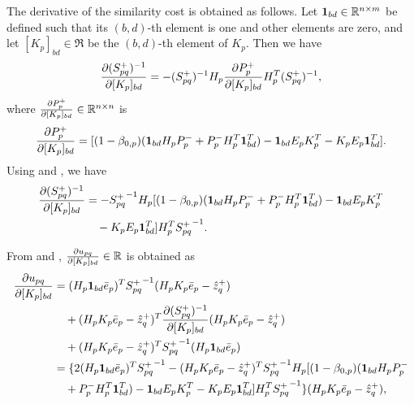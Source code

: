 \begin{appendix}
The derivative of the similarity cost is obtained as follows.
Let $\mathbf{1}_{bd}\in \mathbb{R}^{n\times m}$ be defined such that its $(b,d)$-th element is one and other elements are zero, and let $[K_p]_{bd}\in\Re$ be the $(b,d)$-th element of $K_p$.
Then we have
\begin{align}
\frac{\partial (S^+_{pq})^{-1}}{\partial [K_p]_{bd}}
=-(S^+_{pq})^{-1}
H_p
\frac{\partial P^+_{p}}{\partial [K_p]_{bd}}
H_p^T
(S^+_{pq})^{-1}
,\label{eqn:SS1}
\end{align}
where $\frac{\partial P^+_{p}}{\partial [K_p]_{bd}}\in\mathbb{R}^{n\times n}$ is
\begin{align}
\frac{\partial P^+_{p}}{\partial [K_p]_{bd}}
=
[(1-\beta_{0,p})(\mathbf{1}_{bd} H_pP_p^-+P_p^-H_p^T\mathbf{1}_{bd}^T)-\mathbf{1}_{bd} E_pK_p^T -K_pE_p\mathbf{1}_{bd}^T].\label{eqn:SSmidpart}
\end{align}
Using  and , we have
\begin{align}
\frac{\partial (S^+_{pq})^{-1}}{\partial [K_p]_{bd}}&=-{S^+_{pq}}^{-1}
H_p
[(1-\beta_{0,p})(\mathbf{1}_{bd} H_pP_p^-+P_p^-H_p^T\mathbf{1}_{bd}^T)-\mathbf{1}_{bd} E_pK_p^T
\nonumber
\\
& \quad 
-K_pE_p\mathbf{1}_{bd}^T]
H_p^T
{S^+_{pq}}^{-1}.
\label{eqn:SS2}
\end{align}




From  and , $\frac{\partial u_{pq}}{\partial [K_p]_{bd}}\in\mathbb{R}$ is obtained as
\begin{align}
\frac{\partial u_{pq}}{\partial [K_p]_{bd}}
&=
(H_p\mathbf{1}_{bd}{\bar{e}}_p)^T
{S_{pq}^+}^{-1}
(H_pK_p{\bar{e}}_p-\hat z^+_{q})
\nonumber
\\
& \quad
+(H_pK_p{\bar{e}}_p-\hat z^+_{q})^T
\frac{\partial (S^+_{pq})^{-1}}{\partial [K_p]_{bd}}
(H_pK_p{\bar{e}}_p-\hat z^+_{q})
\nonumber
\\
& \quad 
+
(H_pK_p{\bar{e}}_p-\hat z^+_{q})^T
{S_{pq}^+}^{-1}
(H_p\mathbf{1}_{bd}{\bar{e}}_p)\nonumber
\\
&=
\{
2(H_p\mathbf{1}_{bd}{\bar{e}}_p)^T
{S_{pq}^+}^{-1}
-(H_pK_p{\bar{e}}_p-\hat z^+_{q})^T
{S^+_{pq}}^{-1}
H_p
[(1-\beta_{0,p})(\mathbf{1}_{bd} H_pP_p^-
\nonumber
\\
& \quad
+P_p^-H_p^T\mathbf{1}_{bd}^T)-\mathbf{1}_{bd} E_pK_p^T-K_pE_p\mathbf{1}_{bd}^T]
H_p^T
{S^+_{pq}}^{-1}
\}(H_pK_p{\bar{e}}_p-\hat z^+_{q}),\label{eqn:derivu}
\end{align}


\end{appendix}
